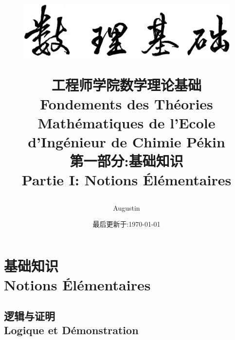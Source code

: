 \documentclass[12pt, a4paper, oneside]{ctexbook}
\title{
\vspace{-2cm}
  \begin{figure}[!t]%
    \centering
    \includegraphics[width=14cm]{shulijichu-2.png}
  \end{figure}
  \vspace{-2cm}
  {\Huge{\textbf{工程师学院数学理论基础\\
Fondements des Théories Mathématiques de l'Ecole d'Ingénieur de Chimie Pékin\\
第一部分:基础知识\\
Partie I: Notions Élémentaires
}}}
}
\author{Augustin}
\date{最后更新于:\today}
\begin{document}
\vspace{-3cm}
\maketitle
\tableofcontents
\else
\part{基础知识\\ Notions Élémentaires}
\fi
\chapter{逻辑与证明\\ Logique et Démonstration}






\ifx\allfiles\undefined
\end{document}

